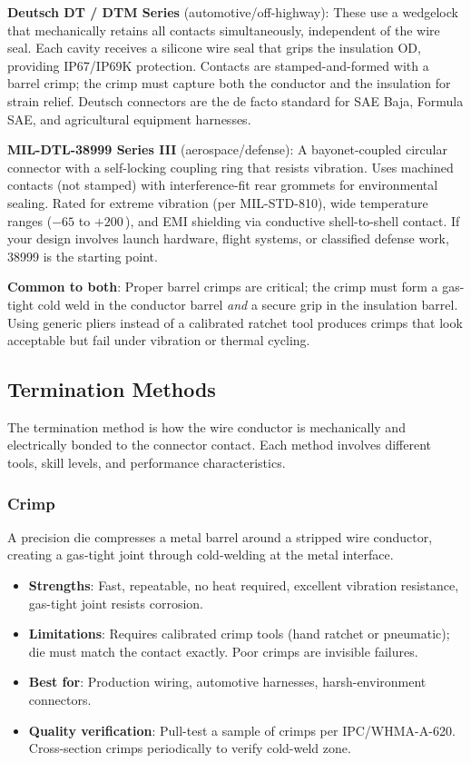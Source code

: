 \textbf{Deutsch DT / DTM Series} (automotive/off-highway): These use a wedgelock that mechanically retains all contacts simultaneously, independent of the wire seal. Each cavity receives a silicone wire seal that grips the insulation OD, providing IP67/IP69K protection. Contacts are stamped-and-formed with a barrel crimp; the crimp must capture both the conductor and the insulation for strain relief. Deutsch connectors are the de facto standard for SAE Baja, Formula SAE, and agricultural equipment harnesses.

\textbf{MIL-DTL-38999 Series III} (aerospace/defense): A bayonet-coupled circular connector with a self-locking coupling ring that resists vibration. Uses machined contacts (not stamped) with interference-fit rear grommets for environmental sealing. Rated for extreme vibration (per MIL-STD-810), wide temperature ranges ($-65$ to $+200$\,\degC{}), and EMI shielding via conductive shell-to-shell contact. If your design involves launch hardware, flight systems, or classified defense work, 38999 is the starting point.

\textbf{Common to both}: Proper barrel crimps are critical; the crimp must form a gas-tight cold weld in the conductor barrel \emph{and} a secure grip in the insulation barrel. Using generic pliers instead of a calibrated ratchet tool produces crimps that look acceptable but fail under vibration or thermal cycling.


\subsection{Termination Methods}
\label{sec:termination}

The termination method is how the wire conductor is mechanically and electrically bonded to the connector contact. Each method involves different tools, skill levels, and performance characteristics.

\subsubsection{Crimp}

A precision die compresses a metal barrel around a stripped wire conductor, creating a gas-tight joint through cold-welding at the metal interface.

\begin{itemize}[nosep,leftmargin=1.5em]
  \item \textbf{Strengths}: Fast, repeatable, no heat required, excellent vibration resistance, gas-tight joint resists corrosion.
  \item \textbf{Limitations}: Requires calibrated crimp tools (hand ratchet or pneumatic); die must match the contact exactly. Poor crimps are invisible failures.
  \item \textbf{Best for}: Production wiring, automotive harnesses, harsh-environment connectors.
  \item \textbf{Quality verification}: Pull-test a sample of crimps per IPC/WHMA-A-620. Cross-section crimps periodically to verify cold-weld zone.
\end{itemize}

